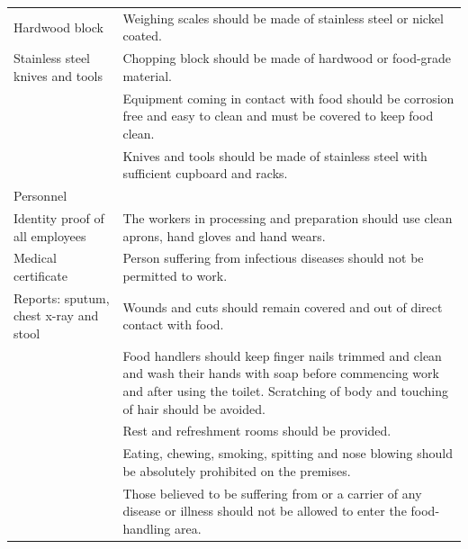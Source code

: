 \documentclass[a4paper, 12pt]{article}
\newcommand\tabitem{\makebox[1em][r]{\textbullet~}}
\begin{document}
\begin{longtable}{>{\raggedright}p{6.5cm}>{\raggedright\arraybackslash}p{8.5cm}}
	\newline{} \newline{} \tabitem Hardwood block	&	\newline{} \tabitem Weighing scales should be made of stainless steel or nickel coated.\\
	\newline{} \tabitem Stainless steel knives and tools 	&	\newline{} \tabitem Chopping block should be made of hardwood or food-grade material.\\
	&	\newline{} \tabitem Equipment coming in contact with food should be corrosion free and easy to clean and must be covered to keep food clean.\\
		& 	\newline{}\tabitem Knives and tools should be made of stainless steel with sufficient cupboard and racks. \\
    \midrule
    Personnel	&	\\
    \midrule
    \tabitem Identity proof of all employees	&	 The workers in processing and preparation should use clean aprons, hand gloves and hand wears.\\
\newline{} \tabitem Medical certificate	&	 \newline{}\tabitem Person suffering from infectious diseases should not be permitted to work.\\
\newline{}\tabitem Reports: sputum, chest x-ray and stool	&	\newline{}\tabitem Wounds and cuts should remain covered and out of direct contact with food.\\
	&	\newline{}\tabitem Food handlers should keep finger nails trimmed and clean and wash their hands with soap before commencing work and after using the toilet. Scratching of body and touching of hair should be avoided.\\
	&	\newline{}\tabitem Rest and refreshment rooms should be provided.\\
	&	\newline{}\tabitem Eating, chewing, smoking, spitting and nose blowing should be absolutely prohibited on the premises.\\
	&	\newline{}\tabitem Those believed to be suffering from or a carrier of any disease or illness should not be allowed to enter the food-handling area.\\

\end{longtable}
\end{document}
